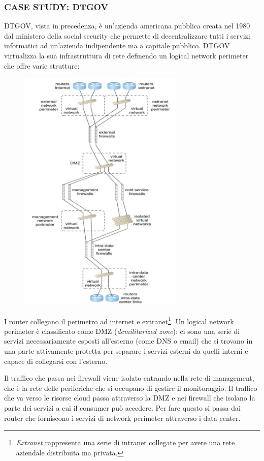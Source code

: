 \subsubsection{\textbf{CASE STUDY: DTGOV}}
DTGOV, vista in precedenza, è un'azienda americana pubblica creata nel 1980 dal ministero della social security che permette di decentralizzare tutti i servizi informatici ad un'azienda indipendente ma a capitale pubblico. DTGOV virtualizza la sua infrastruttura di rete definendo un logical network perimeter che offre varie strutture:

\begin{figure}[htb!]
    \centering
    \includegraphics[width=8cm]{./Images/cap8/8.2.png}
\end{figure}

I router collegano il perimetro ad internet e extranet\footnote{\textit{Extranet} rappresenta una serie di intranet collegate per avere una rete aziendale distribuita ma privata.}. Un logical network perimeter è classificato come DMZ (\textit{demilitarized zone}): ci sono una serie di servizi necessariamente esposti all'esterno (come DNS o email) che si trovano in una parte attivamente protetta per separare i servizi esterni da quelli interni e capace di collegarsi con l'esterno.

Il traffico che passa nei firewall viene isolato entrando nella rete di management, che è la rete delle periferiche che si occupano di gestire il monitoraggio. Il traffico che va verso le risorse cloud passa attraverso la DMZ e nei firewall che isolano la parte dei servizi a cui il consumer può accedere. Per fare questo si passa dai router che forniscono i servizi di network perimeter attraverso i data center.

